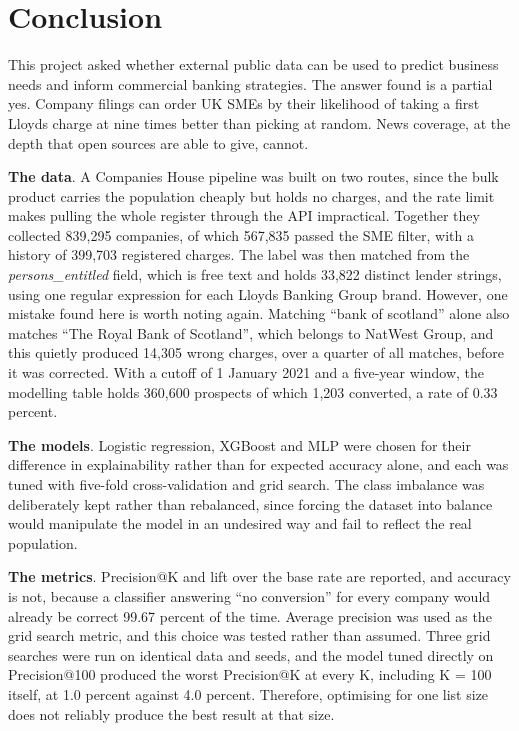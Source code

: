 \chapter{Conclusion}
\label{chap:conclusion}

This project asked whether external public data can be used to predict business needs and inform
commercial banking strategies. The answer found is a partial yes. Company filings can order UK
SMEs by their likelihood of taking a first Lloyds charge at nine times better than picking at
random. News coverage, at the depth that open sources are able to give, cannot.

\textbf{The data}. A Companies House pipeline was built on two routes, since the bulk product
carries the population cheaply but holds no charges, and the rate limit makes pulling the whole
register through the API impractical. Together they collected 839,295 companies, of which 567,835
passed the SME filter, with a history of 399,703 registered charges. The label was then matched
from the \textit{persons\_entitled} field, which is free text and holds 33,822 distinct lender
strings, using one regular expression for each Lloyds Banking Group brand. However, one mistake
found here is worth noting again. Matching ``bank of scotland'' alone also matches ``The Royal
Bank of Scotland'', which belongs to NatWest Group, and this quietly produced 14,305 wrong
charges, over a quarter of all matches, before it was corrected. With a cutoff of 1 January 2021
and a five-year window, the modelling table holds 360,600 prospects of which 1,203 converted, a
rate of 0.33 percent.

\textbf{The models}. Logistic regression, XGBoost and MLP were chosen for their difference in
explainability rather than for expected accuracy alone, and each was tuned with five-fold
cross-validation and grid search. The class imbalance was deliberately kept rather than
rebalanced, since forcing the dataset into balance would manipulate the model in an undesired way
and fail to reflect the real population.

\textbf{The metrics}. Precision@K and lift over the base rate are reported, and accuracy is not,
because a classifier answering ``no conversion'' for every company would already be correct
99.67 percent of the time. Average precision was used as the grid search metric, and this choice
was tested rather than assumed. Three grid searches were run on identical data and seeds, and the
model tuned directly on Precision@100 produced the worst Precision@K at every K, including
K = 100 itself, at 1.0 percent against 4.0 percent. Therefore, optimising for one list size does
not reliably produce the best result at that size.

